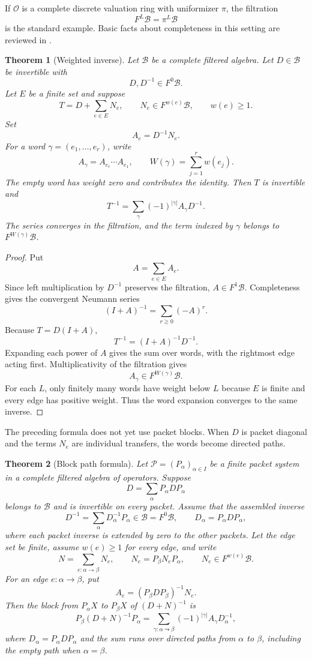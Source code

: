 \documentclass[11pt,a4paper]{article}
\newtheorem{theorem}{Theorem}[section]
\theoremstyle{definition}
\theoremstyle{remark}
\newcommand{\OO}{\mathcal O}
\newcommand{\Bcal}{\mathcal B}
\newcommand{\Pcal}{\mathcal P}
\providecommand{\OO}{\mathcal O}
\theoremstyle{definition}\newtheorem{construction}[theorem]{Construction}\newtheorem{certificate}[theorem]{Numerical Certificate}
\theoremstyle{remark}\newtheorem{boundary}[theorem]{Boundary}
\begin{document}
If $\OO$ is a complete discrete valuation ring with uniformizer $\pi$, the filtration
\[
F^L\Bcal=\pi^L\Bcal
\]
is the standard example.  Basic facts about completeness in this setting are reviewed in \cite{Serre1979}.

\begin{theorem}[Weighted inverse]\label{thm:weighted_inverse}
Let $\Bcal$ be a complete filtered algebra.  Let $D\in\Bcal$ be invertible with
\[
D,D^{-1}\in F^0\Bcal.
\]
Let $E$ be a finite set and suppose
\[
T=D+\sum_{e\in E}N_e,
\qquad
N_e\in F^{w(e)}\Bcal,
\qquad
w(e)\geq1.
\]
Set
\[
A_e=D^{-1}N_e.
\]
For a word $\gamma=(e_1,\ldots,e_r)$, write
\[
A_\gamma=A_{e_r}\cdots A_{e_1},
\qquad
W(\gamma)=\sum_{j=1}^rw(e_j).
\]
The empty word has weight zero and contributes the identity.  Then $T$ is invertible and
\[
T^{-1}
=
\sum_\gamma(-1)^{|\gamma|}A_\gamma D^{-1}.
\]
The series converges in the filtration, and the term indexed by $\gamma$ belongs to $F^{W(\gamma)}\Bcal$.
\end{theorem}

\begin{proof}
Put
\[
A=\sum_{e\in E}A_e.
\]
Since left multiplication by $D^{-1}$ preserves the filtration, $A\in F^1\Bcal$.  Completeness gives the convergent Neumann series
\[
(I+A)^{-1}=\sum_{r\geq0}(-A)^r.
\]
Because $T=D(I+A)$,
\[
T^{-1}=(I+A)^{-1}D^{-1}.
\]
Expanding each power of $A$ gives the sum over words, with the rightmost edge acting first.  Multiplicativity of the filtration gives
\[
A_\gamma\in F^{W(\gamma)}\Bcal.
\]
For each $L$, only finitely many words have weight below $L$ because $E$ is finite and every edge has positive weight.  Thus the word expansion converges to the same inverse.
\end{proof}

The preceding formula does not yet use packet blocks.  When $D$ is packet diagonal and the terms $N_e$ are individual transfers, the words become directed paths.

\begin{theorem}[Block path formula]\label{thm:block_path_formula}
Let $\Pcal=(P_\alpha)_{\alpha\in I}$ be a finite packet system in a complete filtered algebra of operators.  Suppose
\[
D=\sum_\alpha P_\alpha D P_\alpha
\]
belongs to $\Bcal$ and is invertible on every packet.  Assume that the assembled inverse
\[
D^{-1}=\sum_\alpha D_\alpha^{-1}P_\alpha\in\Bcal=F^0\Bcal,
\qquad D_\alpha=P_\alpha DP_\alpha,
\]
where each packet inverse is extended by zero to the other packets.  Let the edge set be finite, assume $w(e)\geq1$ for every edge, and write
\[
N=\sum_{e:\alpha\to\beta}N_e,
\qquad
N_e=P_\beta N_eP_\alpha,
\qquad
N_e\in F^{w(e)}\Bcal.
\]
For an edge $e:\alpha\to\beta$, put
\[
A_e=(P_\beta DP_\beta)^{-1}N_e.
\]
Then the block from $P_\alpha X$ to $P_\beta X$ of $(D+N)^{-1}$ is
\[
P_\beta(D+N)^{-1}P_\alpha
=
\sum_{\gamma:\alpha\leadsto\beta}
(-1)^{|\gamma|}A_\gamma D_\alpha^{-1},
\]
where $D_\alpha=P_\alpha DP_\alpha$ and the sum runs over directed paths from $\alpha$ to $\beta$, including the empty path when $\alpha=\beta$.
\end{theorem}
\end{document}
